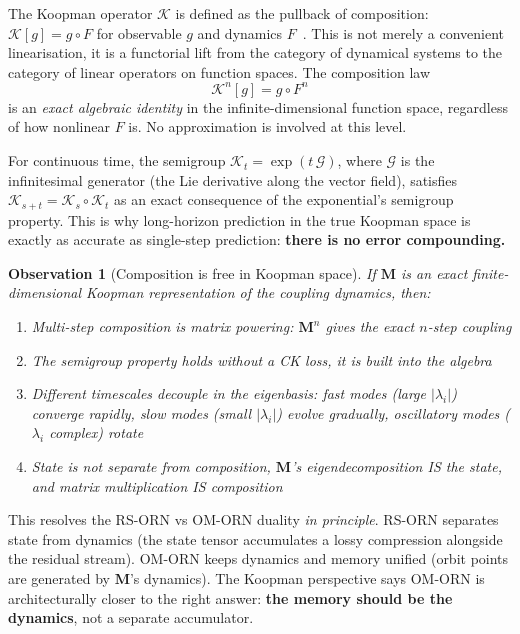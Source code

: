 \documentclass[11pt, a4paper]{article}
\newcommand{\M}{\mathbf{M}}
\theoremstyle{plain}
\newtheorem{observation}{Observation}
\theoremstyle{remark}
\begin{document}
The Koopman operator $\mathcal{K}$ is defined as the pullback of composition: $\mathcal{K}[g] = g \circ F$ for observable $g$ and dynamics $F$~\cite{koopman_original, brunton2022modern}.
This is not merely a convenient linearisation, it is a functorial lift from the category of dynamical systems to the category of linear operators on function spaces.
The composition law
\[
    \mathcal{K}^n[g] = g \circ F^n
\]
is an \emph{exact algebraic identity} in the infinite-dimensional function space, regardless of how nonlinear $F$ is.
No approximation is involved at this level.

For continuous time, the semigroup $\mathcal{K}_t = \exp(t \, \mathcal{G})$, where $\mathcal{G}$ is the infinitesimal generator (the Lie derivative along the vector field), satisfies $\mathcal{K}_{s+t} = \mathcal{K}_s \circ \mathcal{K}_t$ as an exact consequence of the exponential's semigroup property.
This is why long-horizon prediction in the true Koopman space is exactly as accurate as single-step prediction: \textbf{there is no error compounding.}

\begin{observation}[Composition is free in Koopman space]
If $\M$ is an exact finite-dimensional Koopman representation of the coupling dynamics, then:
\begin{enumerate}[nosep]
    \item Multi-step composition is matrix powering: $\M^n$ gives the exact $n$-step coupling
    \item The semigroup property holds without a CK loss, it is built into the algebra
    \item Different timescales decouple in the eigenbasis: fast modes (large $|\lambda_i|$) converge rapidly, slow modes (small $|\lambda_i|$) evolve gradually, oscillatory modes ($\lambda_i$ complex) rotate
    \item State is not separate from composition, $\M$'s eigendecomposition IS the state, and matrix multiplication IS composition
\end{enumerate}
\end{observation}

This resolves the RS-ORN vs OM-ORN duality \emph{in principle}.
RS-ORN separates state from dynamics (the state tensor accumulates a lossy compression alongside the residual stream).
OM-ORN keeps dynamics and memory unified (orbit points are generated by $\M$'s dynamics).
The Koopman perspective says OM-ORN is architecturally closer to the right answer: \textbf{the memory should be the dynamics}, not a separate accumulator.
\end{document}
